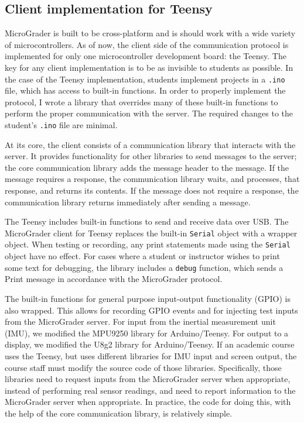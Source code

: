 \documentclass[12pt]{article}
\begin{document}
\begin{appendices}
\section{Client implementation for Teensy}
\label{sec:teensy}
MicroGrader is built to be cross-platform and is should work with a wide variety of microcontrollers.  As of now, the client side of the communication protocol is implemented for only one microcontroller development board: the Teensy.  The key for any client implementation is to be as invisible to students as possible.  In the case of the Teensy implementation, students implement projects in a \texttt{.ino} file, which has access to built-in functions.  In order to properly implement the protocol, I wrote a library that overrides many of these built-in functions to perform the proper communication with the server.  The required changes to the student's \texttt{.ino} file are minimal.

At its core, the client consists of a communication library that interacts with the server.  It provides functionality for other libraries to send messages to the server; the core communication library adds the message header to the message.  If the message requires a response, the communication library waits, and processes, that response, and returns its contents.  If the message does not require a response, the communication library returns immediately after sending a message.

The Teensy includes built-in functions to send and receive data over USB.  The MicroGrader client for Teensy replaces the built-in \texttt{Serial} object with a wrapper object.  When testing or recording, any print statements made using the \texttt{Serial} object have no effect.  For cases where a student or instructor wishes to print some text for debugging, the library includes a \texttt{debug} function, which sends a Print message in accordance with the MicroGrader protocol.  

The built-in functions for general purpose input-output functionality (GPIO) is also wrapped.  This allows for recording GPIO events and for injecting test inputs from the MicroGrader server.  For input from the inertial measurement unit (IMU), we modified the MPU9250 \cite{MPU9250} library for Arduino/Teensy.  For output to a display, we modified the U8g2 \cite{u8g2} library for Arduino/Teensy.  If an academic course uses the Teensy, but uses different libraries for IMU input and screen output, the course staff must modify the source code of those libraries.  Specifically, those libraries need to request inputs from the MicroGrader server when appropriate, instead of performing real sensor readings, and need to report information to the MicroGrader server when appropriate.  In practice, the code for doing this, with the help of the core communication library, is relatively simple.


\end{appendices}
\end{document}

